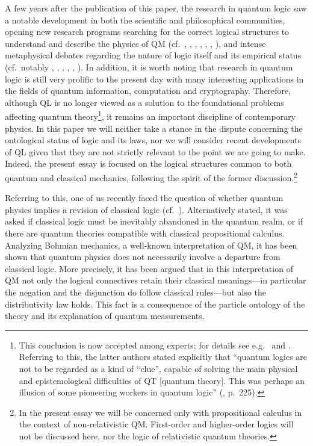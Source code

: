 \documentclass[11pt, executivepaper]{article}
\begin{document}
A few years after the publication of this paper, the research in quantum logic saw a notable development in both the scientific and philosophical communities, opening new research programs searching for the correct logical structures to understand and describe the physics of QM (cf.\ \cite{Reichenbach:1944}, \cite{Mackey:1957}, \cite{Finkelstein:1963}, \cite{Kochen:1965}, \cite{Jauch:1969}, \cite{Giuntini:2002}, \cite{DallaChiara:2004}), and intense metaphysical debates regarding the nature of logic itself and its empirical status (cf.\ notably \cite{Quine:1951}, \cite{Putnam:1968}, \cite{Dummett:1976}, \cite{Hallett:1982}, \cite{Weingartner:2004}, \cite{Bacciagaluppi:2009}). In addition, it is worth noting that research in quantum logic is still very prolific to the present day with many interesting applications in the fields of quantum information, computation and cryptography. Therefore, although QL is no longer viewed as a solution to the foundational problems affecting quantum theory\footnote{This conclusion is now accepted among experts; for details see e.g.\ \cite{Bacciagaluppi:2009} and \cite{Giuntini:2002}. Referring to this, the latter authors stated explicitly that ``quantum logics are not to be regarded as a kind of ``clue'', capable of solving the main physical and epistemological difficulties of QT [quantum theory]. This was perhaps an illusion of some pioneering workers in quantum logic'' (\cite{Giuntini:2002}, p.\ 225).}, it remains an important discipline of contemporary physics. In this paper we will neither take a stance in the dispute concerning the ontological status of logic and its laws, nor we will consider recent developments of QL given that they are not strictly relevant to the point we are going to make. Indeed, the present essay is focused on the logical structures common to both quantum and classical mechanics, following the spirit of the former discussion.\footnote{In the present essay we will be concerned only with propositional calculus in the context of non-relativistic QM. First-order and higher-order logics will not be discussed here, nor the logic of relativistic quantum theories.} 

Referring to this, one of us recently faced the question of whether quantum physics implies a revision of classical logic (cf.\ \cite{Oldofredi:2020}). Alternatively stated, it was asked if classical logic must be inevitably abandoned in the quantum realm, or if there are quantum theories compatible with classical propositional calculus. Analyzing Bohmian mechanics, a well-known interpretation of QM, it has been shown that quantum physics does not necessarily involve a departure from classical logic. More precisely, it has been argued that in this interpretation of QM not only the logical connectives retain their classical meanings---in particular the negation and the disjunction do follow classical rules---but also the distributivity law holds. This fact is a consequence of the particle ontology of the theory and its explanation of quantum measurements.
\end{document}

